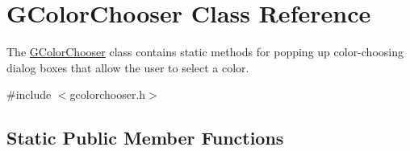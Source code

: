 \hypertarget{classGColorChooser}{}\section{G\+Color\+Chooser Class Reference}
\label{classGColorChooser}


The \mbox{\hyperlink{classGColorChooser}{G\+Color\+Chooser}} class contains static methods for popping up color-\/choosing dialog boxes that allow the user to select a color.  




{\ttfamily \#include $<$gcolorchooser.\+h$>$}

\subsection*{Static Public Member Functions}
